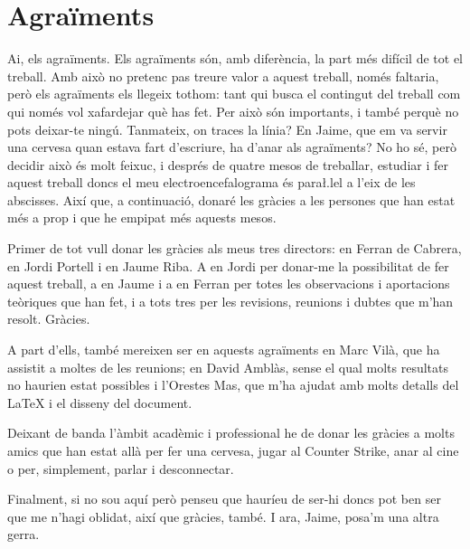 \chapter*{Agraïments}
Ai, els agraïments. Els agraïments són, amb diferència, la part més difícil de tot el treball. Amb això no pretenc pas treure valor a aquest treball, només faltaria, però els agraïments els llegeix tothom: tant qui busca el contingut del treball com qui només vol xafardejar què has fet. Per això són importants, i també perquè no pots deixar-te ningú. Tanmateix, on traces la línia? En Jaime, que em va servir una cervesa quan estava fart d'escriure, ha d'anar als agraïments? No ho sé, però decidir això és molt feixuc, i després de quatre mesos de treballar, estudiar i fer aquest treball doncs el meu electroencefalograma és para\l.lel a l'eix de les abscisses. Així que, a continuació, donaré les gràcies a les persones que han estat més a prop i que he empipat més aquests mesos.

Primer de tot vull donar les gràcies als meus tres directors: en Ferran de Cabrera, en Jordi Portell i en Jaume Riba. A en Jordi per donar-me la possibilitat de fer aquest treball, a en Jaume i a en Ferran per totes les observacions i aportacions teòriques que han fet, i a tots tres per les revisions, reunions i dubtes que m'han resolt. Gràcies.

A part d'ells, també mereixen ser en aquests agraïments en Marc Vilà, que ha assistit a moltes de les reunions; en David Amblàs, sense el qual molts resultats no haurien estat possibles i l'Orestes Mas, que m'ha ajudat amb molts detalls del \LaTeX{} i el disseny del document.

Deixant de banda l'àmbit acadèmic i professional he de donar les gràcies a molts amics que han estat allà per fer una cervesa, jugar al Counter Strike, anar al cine o per, simplement, parlar i desconnectar.

Finalment, si no sou aquí però penseu que hauríeu de ser-hi doncs pot ben ser que me n'hagi oblidat, així que gràcies, també. I ara, Jaime, posa'm una altra gerra.
